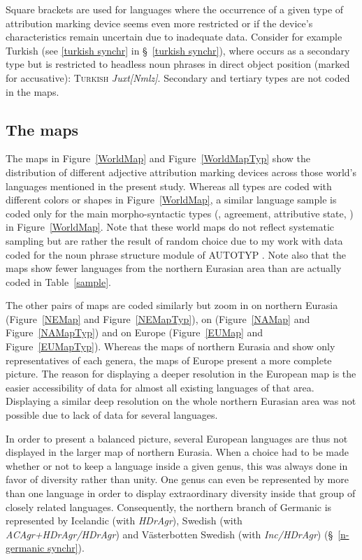 Square brackets are used for languages where the occurrence of a given type of attribution marking device seems even more restricted or if the device's characteristics remain uncertain due to inadequate data. Consider for example Turkish (see \ref{turkish synchr} in \S~\ref{turkish synchr}), where  occurs as a secondary type but is restricted to headless noun phrases in direct object position (marked for accusative): \textsc{Turkish} \textit{Juxt[Nmlz]}. 
Secondary and tertiary types are not coded in the maps. 

\subsection{The maps}
The maps in Figure~\ref{WorldMap} and Figure~\ref{WorldMapTyp} show the distribution of different adjective attribution marking devices across those world's languages mentioned in the present study. Whereas all types are coded with different colors or shapes in Figure~\ref{WorldMap}, a similar language sample is coded only for the main morpho-syntactic types (, agreement, attributive state, ) in Figure~\ref{WorldMap}. Note that these world maps do not reflect systematic sampling but are rather the result of random choice due to my work with data coded for the noun phrase structure module of AUTOTYP \citep{AUTOTYP-NP}. Note also that the maps show fewer languages from the northern Eurasian area than are actually coded in Table~\ref{sample}.

The other pairs of maps are coded similarly but zoom in on northern Eurasia (Figure~\ref{NEMap} and Figure~\ref{NEMapTyp}), on  (Figure~\ref{NAMap} and Figure~\ref{NAMapTyp}) and on Europe (Figure~\ref{EUMap} and Figure~\ref{EUMapTyp}). Whereas the maps of northern Eurasia and  show only representatives of each genera, the maps of Europe present a more complete picture. The reason for displaying a deeper resolution in the European map is the easier accessibility of data for almost all existing languages of that area. Displaying a similar deep resolution on the whole northern Eurasian area was not possible due to lack of data for several languages.

In order to present a balanced picture, several European languages are thus not displayed in the larger map of northern Eurasia. When a choice had to be made whether or not to keep a language inside a given genus, this was always done in favor of diversity rather than unity. One genus can even be represented by more than one language in order to display extraordinary diversity inside that group of closely related languages. Consequently, the northern branch of Germanic is represented by Icelandic (with \textit{HDrAgr}), Swedish (with \textit{ACAgr+HDrAgr/HDrAgr}) and Västerbotten Swedish (with \textit{Inc/HDrAgr}) (\S~\ref{n-germanic synchr}).

